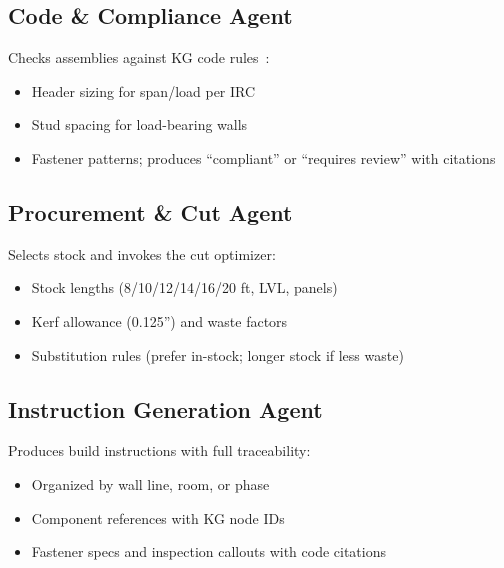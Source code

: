 \subsection{Code \& Compliance Agent}

Checks assemblies against KG code rules~\cite{zhang2023kg_codes, beach2020irc_automation}:
\begin{itemize}
  \item Header sizing for span/load per IRC~\cite{irc2021}
  \item Stud spacing for load-bearing walls
  \item Fastener patterns; produces ``compliant'' or ``requires review'' with citations
\end{itemize}

\subsection{Procurement \& Cut Agent}

Selects stock and invokes the cut optimizer:
\begin{itemize}
  \item Stock lengths (8/10/12/14/16/20 ft, LVL, panels)
  \item Kerf allowance (0.125'') and waste factors
  \item Substitution rules (prefer in-stock; longer stock if less waste)
\end{itemize}

\subsection{Instruction Generation Agent}

Produces build instructions with full traceability:
\begin{itemize}
  \item Organized by wall line, room, or phase
  \item Component references with KG node IDs
  \item Fastener specs and inspection callouts with code citations
\end{itemize}
